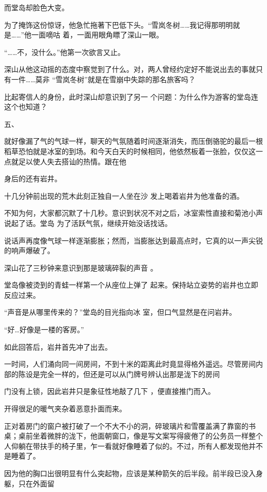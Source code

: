 \documentclass{article}
\begin{document}
\newpage

而堂岛却脸色大变。 

为了掩饰这份惊讶，他急忙拖著下巴低下头。“雪岚冬树……我记得那明明就是……”他一面嘀咕
着，一面用眼角瞟了深山一眼。 


“……不，没什么。”他第一次欲言又止。 

深山从他这动摇的态度中察觉到了什么。对，两人曾经约定好不能说出去的事就只有一件……莫非
“雪岚冬树”就是在雪崩中失踪的那名旅客吗？ 

比起寄信人的身份，此时深山却意识到了另一
个问题：为什么作为游客的堂岛连这个也知道？ 


五、 

就好像漏了气的气球一样，聊天的气氛随着时间逐渐消失，而压倒骆驼的最后一根稻草恐怕就是冰室的到场。和今天白天的时候相同，他依然板着一张脸，仅仅这一点就足以使人失去搭讪的热情。跟在他

\newpage
身后的还有岩井。 

十几分钟前出现的荒木此刻正独自一人坐在沙
发上喝着岩井为他准备的酒。 

不知为何，大家都沉默了十几秒。意识到状况不对之后，冰室索性直接和菊池小声说起了话。堂岛
为了活跃气氛，继续开始没话找话。 

说话声再度像气球一样逐渐膨胀；然而，当膨胀达到最高点时，它真的以一声尖锐的响声爆破了。

深山花了三秒钟来意识到那是玻璃碎裂的声音
。 

堂岛像被烫到的青蛙一样第一个从座位上弹了
起来。保持站立姿势的岩井也立即反应过来。 

“声音是从哪里传来的？”堂岛的目光指向冰
室，但口气显然是在问岩井。 


\newpage

“好…好像是一楼的客房。” 


如此回答后，岩井首先冲了出去。 

一时间，人们涌向同一间房间，不到十米的距离此时竟显得格外遥远。尽管房间内部的陈设是完全一样的，但还是可以从门牌号辨认出那是泷下的房间

门没有上锁，因此岩井只是象征性地敲了几下
，便直接推门而入。 


开得很足的暖气夹杂着恶意扑面而来。 

正对着房门的窗户被打破了一个不大不小的洞，碎玻璃片和雪覆盖满了靠窗的书桌；桌前坐着微胖的泷下，他面朝窗口，像是写文案写得疲倦了的公务员一样整个人仰躺在带扶手的椅子里，乍一看就好像睡着了似的。不过，所有人都发现他并不是睡着了。

因为他的胸口出很明显有什么突起物，应该是某种箭矢的后半段。前半段已没入身躯，只在外面留
\end{document}
